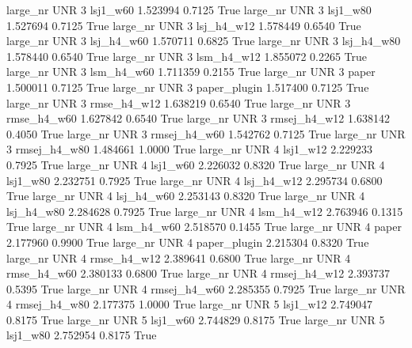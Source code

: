   large_nr      UNR                 3     lsj1_w60    1.523994      0.7125    True
  large_nr      UNR                 3     lsj1_w80    1.527694      0.7125    True
  large_nr      UNR                 3   lsj_h4_w12    1.578449      0.6540    True
  large_nr      UNR                 3   lsj_h4_w60    1.570711      0.6825    True
  large_nr      UNR                 3   lsj_h4_w80    1.578440      0.6540    True
  large_nr      UNR                 3   lsm_h4_w12    1.855072      0.2265    True
  large_nr      UNR                 3   lsm_h4_w60    1.711359      0.2155    True
  large_nr      UNR                 3        paper    1.500011      0.7125    True
  large_nr      UNR                 3 paper_plugin    1.517400      0.7125    True
  large_nr      UNR                 3  rmse_h4_w12    1.638219      0.6540    True
  large_nr      UNR                 3  rmse_h4_w60    1.627842      0.6540    True
  large_nr      UNR                 3 rmsej_h4_w12    1.638142      0.4050    True
  large_nr      UNR                 3 rmsej_h4_w60    1.542762      0.7125    True
  large_nr      UNR                 3 rmsej_h4_w80    1.484661      1.0000    True
  large_nr      UNR                 4     lsj1_w12    2.229233      0.7925    True
  large_nr      UNR                 4     lsj1_w60    2.226032      0.8320    True
  large_nr      UNR                 4     lsj1_w80    2.232751      0.7925    True
  large_nr      UNR                 4   lsj_h4_w12    2.295734      0.6800    True
  large_nr      UNR                 4   lsj_h4_w60    2.253143      0.8320    True
  large_nr      UNR                 4   lsj_h4_w80    2.284628      0.7925    True
  large_nr      UNR                 4   lsm_h4_w12    2.763946      0.1315    True
  large_nr      UNR                 4   lsm_h4_w60    2.518570      0.1455    True
  large_nr      UNR                 4        paper    2.177960      0.9900    True
  large_nr      UNR                 4 paper_plugin    2.215304      0.8320    True
  large_nr      UNR                 4  rmse_h4_w12    2.389641      0.6800    True
  large_nr      UNR                 4  rmse_h4_w60    2.380133      0.6800    True
  large_nr      UNR                 4 rmsej_h4_w12    2.393737      0.5395    True
  large_nr      UNR                 4 rmsej_h4_w60    2.285355      0.7925    True
  large_nr      UNR                 4 rmsej_h4_w80    2.177375      1.0000    True
  large_nr      UNR                 5     lsj1_w12    2.749047      0.8175    True
  large_nr      UNR                 5     lsj1_w60    2.744829      0.8175    True
  large_nr      UNR                 5     lsj1_w80    2.752954      0.8175    True
